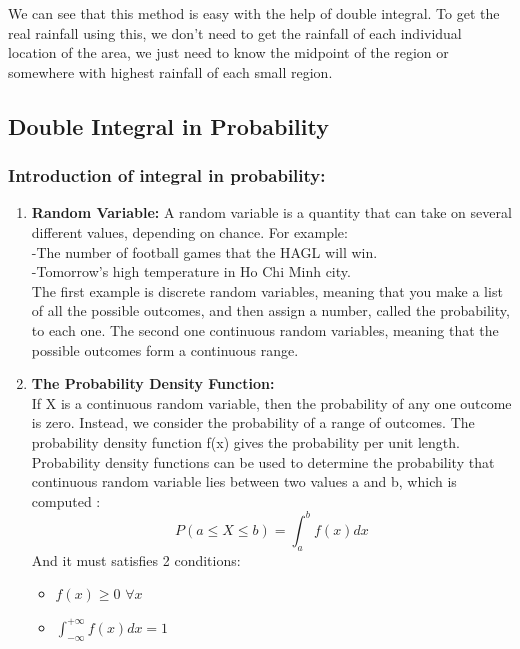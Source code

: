 \documentclass[a4paper]{article}
\begin{document}
	We can see that this method is easy with the help of double integral. To get the real rainfall using this, we don't need to get the rainfall of each individual location of the area, we just need to know the midpoint of the region or somewhere with highest rainfall of each small region.
	
	\newpage
	\subsection{Double Integral in Probability}
	\subsubsection*{Introduction of integral in probability:}
	\begin{enumerate}
		\item \textbf{Random Variable:} A random variable is a quantity that can take on several different values, depending on chance. For example: \\
		-The number of football games that the HAGL will win. \\
		-Tomorrow's high temperature in Ho Chi Minh city. \\
		The first example is discrete random variables, meaning that you make a list of all the possible outcomes, and then assign a number, called the probability, to each one. The second one continuous random variables, meaning that the possible outcomes form a continuous range.
		\item \textbf{The Probability Density Function:} \\ 
		If X is a continuous random variable, then the probability of any one outcome is zero. Instead, we consider the probability of a range of outcomes. The probability density function f(x) gives the probability per unit length. \\
		Probability density functions can be used to determine the probability that continuous random variable lies between two values a and b, which is computed :
		\begin{equation*}
		P ( a \leq X \leq b) = \int_{a}^{b} f(x) dx
		\end{equation*}
		And it must satisfies 2 conditions:
		\begin{itemize}
			\item $f(x) \geq 0$ $\forall x $
			\item $\int_{-\infty}^{+\infty} f(x) dx = 1$
		\end{itemize}

\end{enumerate}
\end{document}
